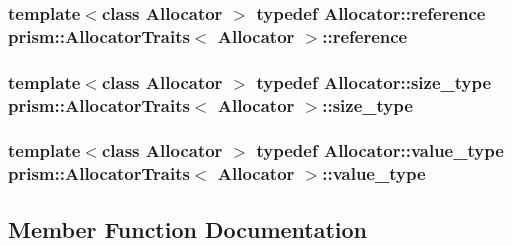 \subsubsection[{\texorpdfstring{reference}{reference}}]{\setlength{\rightskip}{0pt plus 5cm}template$<$class Allocator $>$ typedef {\bf Allocator\+::reference} {\bf prism\+::\+Allocator\+Traits}$<$ {\bf Allocator} $>$\+::{\bf reference}}\hypertarget{structprism_1_1_allocator_traits_aee67923dfcf22628468bf2faacc31cb3}{}\label{structprism_1_1_allocator_traits_aee67923dfcf22628468bf2faacc31cb3}
\subsubsection[{\texorpdfstring{size\+\_\+type}{size_type}}]{\setlength{\rightskip}{0pt plus 5cm}template$<$class Allocator $>$ typedef {\bf Allocator\+::size\+\_\+type} {\bf prism\+::\+Allocator\+Traits}$<$ {\bf Allocator} $>$\+::{\bf size\+\_\+type}}\hypertarget{structprism_1_1_allocator_traits_a4de8d85d17a31ddc325c2ac079ea1910}{}\label{structprism_1_1_allocator_traits_a4de8d85d17a31ddc325c2ac079ea1910}
\subsubsection[{\texorpdfstring{value\+\_\+type}{value_type}}]{\setlength{\rightskip}{0pt plus 5cm}template$<$class Allocator $>$ typedef {\bf Allocator\+::value\+\_\+type} {\bf prism\+::\+Allocator\+Traits}$<$ {\bf Allocator} $>$\+::{\bf value\+\_\+type}}\hypertarget{structprism_1_1_allocator_traits_ab733362182b9f46d27ca6bdddaa23d67}{}\label{structprism_1_1_allocator_traits_ab733362182b9f46d27ca6bdddaa23d67}


\subsection{Member Function Documentation}
